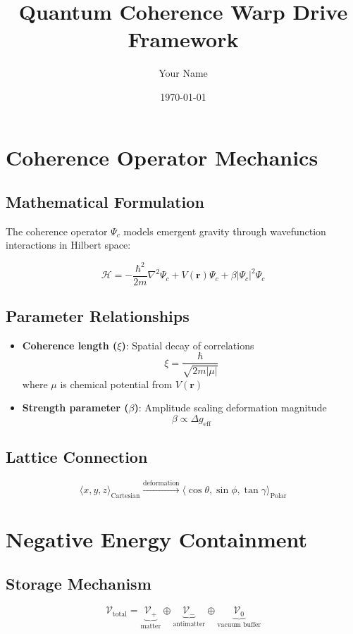 \documentclass{article}
\title{Quantum Coherence Warp Drive Framework}
\author{Your Name}
\date{\today}
\begin{document}
\maketitle

\section{Coherence Operator Mechanics}
\subsection{Mathematical Formulation}
The coherence operator $\Psi_c$ models emergent gravity through wavefunction interactions in Hilbert space:

\begin{equation}
\mathcal{H} = -\frac{\hbar^2}{2m}\nabla^2\Psi_c + V(\mathbf{r})\Psi_c + \beta |\Psi_c|^2\Psi_c
\end{equation}

\subsection{Parameter Relationships}
\begin{itemize}
    \item \textbf{Coherence length ($\xi$)}: Spatial decay of correlations
    \[ \xi = \frac{\hbar}{\sqrt{2m|\mu|}} \]
    where $\mu$ is chemical potential from $V(\mathbf{r})$
    
    \item \textbf{Strength parameter ($\beta$)}: Amplitude scaling deformation magnitude
    \[ \beta \propto \Delta g_{\text{eff}} \]
\end{itemize}

\subsection{Lattice Connection}
\begin{equation}
\langle x,y,z \rangle_{\text{Cartesian}} \xrightarrow{\text{deformation}} \langle \cos\theta, \sin\phi, \tan\gamma \rangle_{\text{Polar}}
\end{equation}

\section{Negative Energy Containment}
\subsection{Storage Mechanism}
\begin{equation}
\mathcal{V}_{\text{total}} = \underbrace{\mathcal{V}_+}_{\text{matter}} \oplus \underbrace{\mathcal{V}_-}_{\text{antimatter}} \oplus \underbrace{\mathcal{V}_0}_{\text{vacuum buffer}}
\end{equation}
\end{document}
